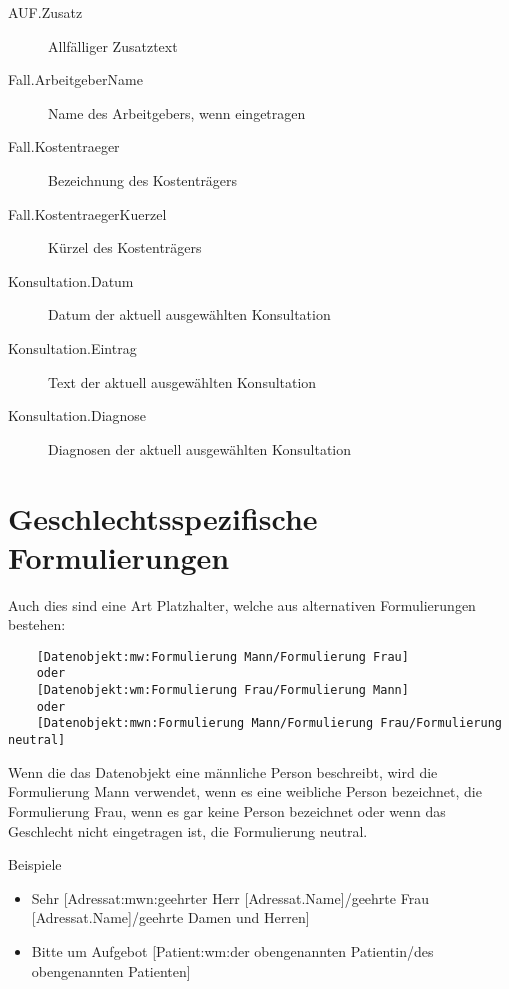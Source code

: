 \begin{description}
  \item [AUF.Zusatz] Allfälliger Zusatztext
  \item [Fall.ArbeitgeberName] Name des Arbeitgebers, wenn eingetragen
  \item [Fall.Kostentraeger] Bezeichnung des Kostenträgers
  \item [Fall.KostentraegerKuerzel] Kürzel des Kostenträgers
  \item [Konsultation.Datum] Datum der aktuell ausgewählten Konsultation
  \item [Konsultation.Eintrag] Text der aktuell ausgewählten Konsultation
  \item [Konsultation.Diagnose] Diagnosen der aktuell ausgewählten Konsultation

\end{description}

\section{Geschlechtsspezifische Formulierungen}
Auch dies sind eine Art Platzhalter, welche aus alternativen Formulierungen bestehen:

\begin{verbatim}
    [Datenobjekt:mw:Formulierung Mann/Formulierung Frau]
    oder
    [Datenobjekt:wm:Formulierung Frau/Formulierung Mann]
    oder
    [Datenobjekt:mwn:Formulierung Mann/Formulierung Frau/Formulierung neutral]
\end{verbatim}

Wenn die das Datenobjekt eine  männliche Person beschreibt, wird die Formulierung Mann verwendet, wenn es eine weibliche Person bezeichnet, die Formulierung Frau, wenn es gar keine Person bezeichnet oder wenn das Geschlecht nicht eingetragen ist, die Formulierung neutral.

\medskip

Beispiele
\begin{itemize}
    \item Sehr [Adressat:mwn:geehrter Herr [Adressat.Name]/geehrte Frau [Adressat.Name]/geehrte Damen und Herren]
    \item Bitte um Aufgebot [Patient:wm:der obengenannten Patientin/des obengenannten Patienten]
\end{itemize}

